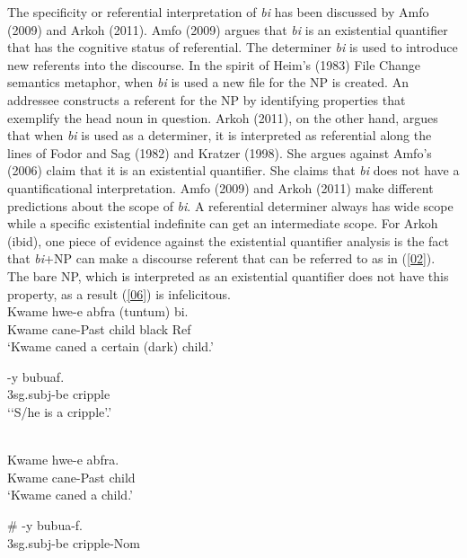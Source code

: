 \documentclass[output=paper,
modfonts
]{langsci/langscibook}
\begin{document}
The specificity or referential interpretation of \emph{bi} has been discussed by Amfo (2009) and Arkoh (2011). Amfo (2009) argues that \emph{bi} is an existential quantifier that has the cognitive status of referential. The determiner \emph{bi} is used to introduce new referents into the discourse. In the spirit of Heim's (1983) File Change semantics metaphor, when \emph{bi} is used a new file for the NP is created. An addressee constructs a referent for the NP by identifying properties that exemplify the head noun in question. Arkoh (2011), on the other hand, argues that when \emph{bi} is used as a determiner, it is interpreted as referential along the lines of Fodor and Sag (1982) and Kratzer (1998). She argues against Amfo's (2006) claim that it is an existential quantifier. She claims that \emph{bi} does not have a quantificational interpretation. Amfo (2009) and Arkoh (2011) make different predictions about the scope of \emph{bi}. A referential determiner always has wide scope while a specific existential indefinite can get an intermediate scope. For Arkoh (ibid), one piece of evidence against the existential quantifier analysis is the fact that \emph{bi}+NP can make a discourse referent that can be referred to as in (\ref{02}). The bare NP, which is interpreted as an existential quantifier does not have this property, as a result (\ref{06}) is infelicitous.    
\ea
{}\\
\ea\label{01} 
\gll Kwame  hwe-e  abfra (tuntum) bi.\\
 Kwame cane-Past child black Ref\\
 
\glt ‘Kwame caned a certain (dark) child.'

\ex\label{02}
\gll {}-y bubuaf.\\
3sg.subj-be cripple\\
 
\glt ‘‘S/he is a cripple’.'
\z \z

\ea
{}\\
\ea\label{05} 
\gll Kwame  hwe-e  abfra.\\
 Kwame cane-Past child \\
 
\glt ‘Kwame caned a child.'

\ex\label{06}
\gll \# -y bubua-f.\\
{} 3sg.subj-be cripple-Nom\\
 
\end{document}
